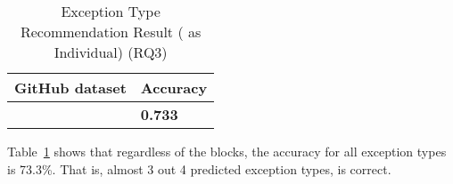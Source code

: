 \begin{table}[t]%
  \caption{Exception Type Recommendation Result ({\xtype} as Individual) (RQ3)}
  \vspace{-12pt}
  \small
	\begin{center}
		\renewcommand{\arraystretch}{1}
		\begin{tabular}{| p{3.05cm}<{\centering} | p{1.2cm}<{\centering}|}
		  \hline
			GitHub dataset  & Accuracy \\
			\hline
			\xtype   & \textbf{0.733} \\
			\hline
		\end{tabular}
		\label{tab:xtype-3}
	\end{center}
\end{table}

Table~\ref{tab:xtype-3} shows that regardless of the blocks, the
accuracy for all exception types is 73.3\%. That is, almost 3 out 4
predicted exception types, {\xtype} is correct.
